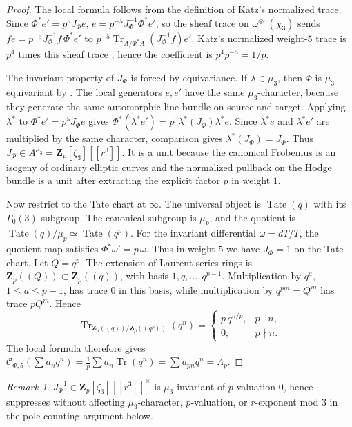 \documentclass[11pt]{amsart}
\theoremstyle{definition}
\theoremstyle{remark}
\newtheorem{remark}[theorem]{Remark}
\newcommand{\Z}{\mathbf{Z}}
\newcommand{\Tr}{\operatorname{Tr}}
\begin{document}
\begin{proof}
The local formula follows from the definition of Katz's normalized trace. Since $\Phi^*e'=p^5J_\Phi e$, $e=p^{-5}J_\Phi^{-1}\Phi^*e'$, so the sheaf trace on $\omega^{\otimes 5}(\chi_3)$ sends $fe=p^{-5}J_\Phi^{-1}f\,\Phi^*e'$ to $p^{-5}\Tr_{A/\Phi^*A}(J_\Phi^{-1}f)e'$. Katz's normalized weight-$5$ trace is $p^4$ times this sheaf trace \cite[\S 3.11]{Katz-padic}, hence the coefficient is $p^4p^{-5}=1/p$.

The invariant property of $J_\Phi$ is forced by equivariance. If $\lambda\in\mu_3$, then $\Phi$ is $\mu_3$-equivariant by . The local generators $e,e'$ have the same $\mu_3$-character, because they generate the same automorphic line bundle on source and target. Applying $\lambda^*$ to $\Phi^*e'=p^5J_\Phi e$ gives $\Phi^*(\lambda^*e')=p^5\lambda^*(J_\Phi)\lambda^*e$. Since $\lambda^*e$ and $\lambda^*e'$ are multiplied by the same character, comparison gives $\lambda^*(J_\Phi)=J_\Phi$. Thus $J_\Phi\in A^{\mu_3}=\Z_p[\zeta_3][[r^3]]$. It is a unit because the canonical Frobenius is an isogeny of ordinary elliptic curves and the normalized pullback on the Hodge bundle is a unit after extracting the explicit factor $p$ in weight $1$.

Now restrict to the Tate chart at $\infty$. The universal object is $\operatorname{Tate}(q)$ with its $\Gamma_0(3)$-subgroup. The canonical subgroup is $\mu_p$, and the quotient is $\operatorname{Tate}(q)/\mu_p\simeq\operatorname{Tate}(q^p)$. For the invariant differential $\omega=dT/T$, the quotient map satisfies $\Phi^*\omega'=p\,\omega$. Thus in weight $5$ we have $J_\Phi=1$ on the Tate chart. Let $Q=q^p$. The extension of Laurent series rings is $\Z_p((Q))\subset\Z_p((q))$, with basis $1,q,\ldots,q^{p-1}$. Multiplication by $q^a$, $1\le a\le p-1$, has trace $0$ in this basis, while multiplication by $q^{pm}=Q^m$ has trace $pQ^m$. Hence
\[
\Tr_{\Z_p((q))/\Z_p((q^p))}(q^n)=\begin{cases}p\,q^{n/p},& p\mid n,\\ 0,& p\nmid n.\end{cases}
\]
The local formula therefore gives $\mathcal C_{\Phi,5}(\sum a_nq^n)=\frac{1}{p}\sum a_n\Tr(q^n)=\sum a_{pn}q^n=\Lambda_p$.
\end{proof}

\begin{remark}\label{rem:JPhi-suppression}
$J_\Phi^{-1}\in\Z_p[\zeta_3][[r^3]]^\times$ is $\mu_3$-invariant of $p$-valuation $0$, hence suppresses without affecting $\mu_3$-character, $p$-valuation, or $r$-exponent mod $3$ in the pole-counting argument below.
\end{remark}
\end{document}
